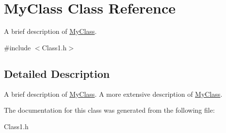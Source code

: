 \hypertarget{classMyClass}{
\section{MyClass Class Reference}
\label{classMyClass}
}


A brief description of \hyperlink{classMyClass}{MyClass}.  




{\ttfamily \#include $<$Class1.h$>$}



\subsection{Detailed Description}
A brief description of \hyperlink{classMyClass}{MyClass}. A more extensive description of \hyperlink{classMyClass}{MyClass}. 

The documentation for this class was generated from the following file:\begin{DoxyCompactItemize}
\item 
Class1.h\end{DoxyCompactItemize}
